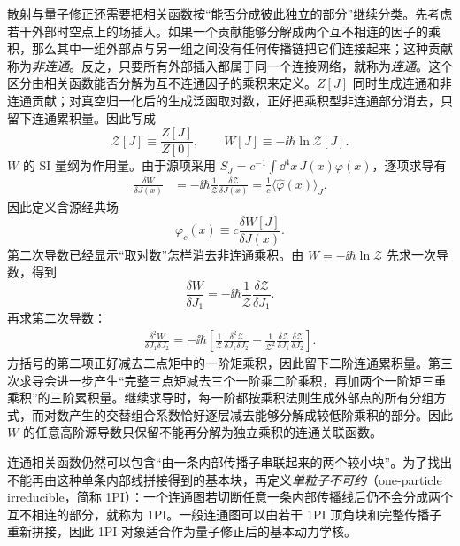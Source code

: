 

散射与量子修正还需要把相关函数按“能否分成彼此独立的部分”继续分类。先考虑若干外部时空点上的场插入。如果一个贡献能够分解成两个互不相连的因子的乘积，那么其中一组外部点与另一组之间没有任何传播链把它们连接起来；这种贡献称为\emph{非连通}。反之，只要所有外部插入都属于同一个连接网络，就称为\emph{连通}。这个区分由相关函数能否分解为互不连通因子的乘积来定义。$Z[J]$ 同时生成连通和非连通贡献；对真空归一化后的生成泛函取对数，正好把乘积型非连通部分消去，只留下连通累积量。因此写成
\begin{equation}
\mathcal Z[J]\equiv\frac{Z[J]}{Z[0]},
\qquad
W[J]\equiv-\ii\hbar\ln\mathcal Z[J].
\label{eq:connected_generating_functional_definition}
\end{equation}
$W$ 的 SI 量纲为作用量。由于源项采用
$S_J=c^{-1}\int\dd^4 x\,J(x)\varphi(x)$，逐项求导有
\begin{align*}
\frac{\delta W}{\delta J(x)}
&=-\ii\hbar\frac1{\mathcal Z}
\frac{\delta\mathcal Z}{\delta J(x)}
=\frac1c\langle\hat\varphi(x)\rangle_J.
\end{align*}
因此定义含源经典场
\begin{equation}
\boxed{
\varphi_c(x)\equiv c\frac{\delta W[J]}{\delta J(x)}.}
\label{eq:qft_classical_field_from_W}
\end{equation}
第二次导数已经显示“取对数”怎样消去非连通乘积。由
\(
W=-\ii\hbar\ln\mathcal Z
\)
先求一次导数，得到
\begin{equation*}
\frac{\delta W}{\delta J_1}
=-\ii\hbar\frac{1}{\mathcal Z}
\frac{\delta\mathcal Z}{\delta J_1}.
\end{equation*}
再求第二次导数：
\begin{align*}
\frac{\delta^2W}{\delta J_1\delta J_2}
=-\ii\hbar\left[
\frac1{\mathcal Z}
\frac{\delta^2\mathcal Z}{\delta J_1\delta J_2}
-\frac1{\mathcal Z^2}
\frac{\delta\mathcal Z}{\delta J_1}
\frac{\delta\mathcal Z}{\delta J_2}
\right].
\end{align*}
方括号的第二项正好减去二点矩中的一阶矩乘积，因此留下二阶连通累积量。第三次求导会进一步产生“完整三点矩减去三个一阶乘二阶乘积，再加两个一阶矩三重乘积”的三阶累积量。继续求导时，每一阶都按乘积法则生成外部点的所有分组方式，而对数产生的交替组合系数恰好逐层减去能够分解成较低阶乘积的部分。因此 $W$ 的任意高阶源导数只保留不能再分解为独立乘积的连通关联函数。

连通相关函数仍然可以包含“由一条内部传播子串联起来的两个较小块”。为了找出不能再由这种单条内部线拼接得到的基本块，再定义\emph{单粒子不可约}（one-particle irreducible，简称 1PI）：一个连通图若切断任意一条内部传播线后仍不会分成两个互不相连的部分，就称为 1PI。一般连通图可以由若干 1PI 顶角块和完整传播子重新拼接，因此 1PI 对象适合作为量子修正后的基本动力学核。

